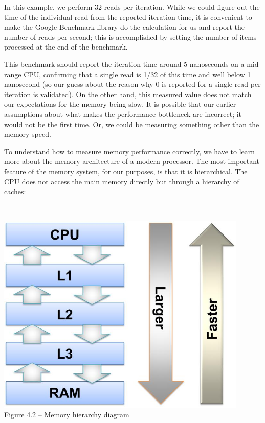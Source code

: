 In this example, we perform 32 reads per iteration. While we could figure out the time of the individual read from the reported iteration time, it is convenient to make the Google Benchmark library do the calculation for us and report the number of reads per second; this is accomplished by setting the number of items processed at the end of the benchmark.

This benchmark should report the iteration time around 5 nanoseconds on a mid-range CPU, confirming that a single read is 1/32 of this time and well below 1 nanosecond (so our guess about the reason why 0 is reported for a single read per iteration is validated). On the other hand, this measured value does not match our expectations for the memory being slow. It is possible that our earlier assumptions about what makes the performance bottleneck are incorrect; it would not be the first time. Or, we could be measuring something other than the memory speed.


To understand how to measure memory performance correctly, we have to learn more about the memory architecture of a modern processor. The most important feature of the memory system, for our purposes, is that it is hierarchical. The CPU does not access the main memory directly but through a hierarchy of caches:

\hspace*{\fill} \\ %
\begin{center}
\includegraphics[width=0.9\textwidth]{content/1/chapter4/images/2.jpg}\\
Figure 4.2 – Memory hierarchy diagram
\end{center}

